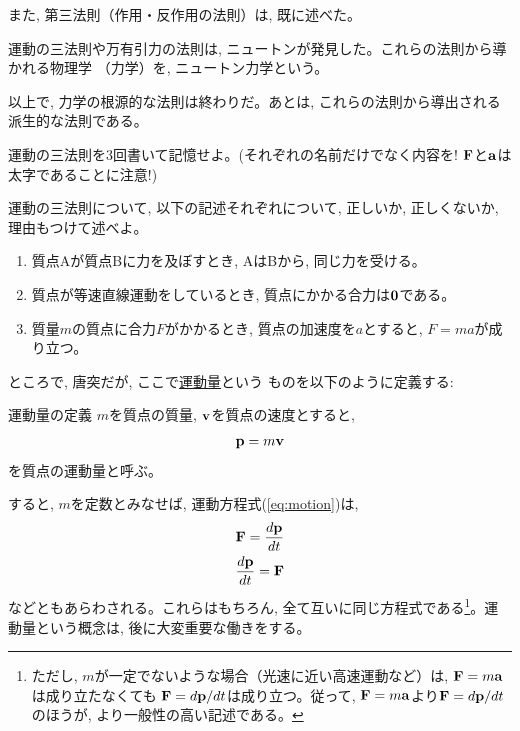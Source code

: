 また, 第三法則（作用・反作用の法則）は, 既に述べた。

運動の三法則や万有引力の法則は, ニュートンが発見した。これらの法則から導かれる物理学
（力学）を, ニュートン力学という。\mv

以上で, 力学の根源的な法則は終わりだ。あとは, これらの法則から導出される派生的な法則である。\mv

\begin{q}\label{q:Newton_3laws}
運動の三法則を3回書いて記憶せよ。(それぞれの名前だけでなく内容を! 
${\bf F}$と${\bf a}$は太字であることに注意!)
\end{q}

\begin{q}\label{q:NewtonLaw_mistake} 運動の三法則について, 
以下の記述それぞれについて, 正しいか, 正しくないか, 理由もつけて述べよ。
\begin{enumerate}
\item 質点Aが質点Bに力を及ぼすとき, AはBから, 同じ力を受ける。
\item 質点が等速直線運動をしているとき, 質点にかかる合力は${\bf 0}$である。
\item 質量$m$の質点に合力$F$がかかるとき, 質点の加速度を$a$とすると, $F=ma$が成り立つ。
\end{enumerate}
\end{q}



ところで, 唐突だが, ここで\underline{運動量}という
ものを以下のように定義する:
\begin{itembox}{運動量の定義}
$m$を質点の質量, ${\bf v}$を質点の速度とすると, 
\begin{eqnarray}{\bf p}=m{\bf v}\label{eq:def_momentum}\end{eqnarray}
を質点の運動量と呼ぶ。
\end{itembox}

すると, $m$を定数とみなせば, 運動方程式(\ref{eq:motion})は, 
\begin{eqnarray}
{\bf F}=\frac{d{\bf p}}{dt}\\
\frac{d{\bf p}}{dt}={\bf F}
\end{eqnarray}
などともあらわされる。これらはもちろん, 全て互いに同じ方程式である\footnote{ただし, 
$m$が一定でないような場合（光速に近い高速運動など）は, ${\bf F}=m{\bf a}$は成り立たなくても
${\bf F}=d{\bf p}/dt$は成り立つ。従って, ${\bf F}=m{\bf a}$より${\bf F}=d{\bf p}/dt$のほうが, 
より一般性の高い記述である。}。運動量という概念は, 後に大変重要な働きをする。\mv

